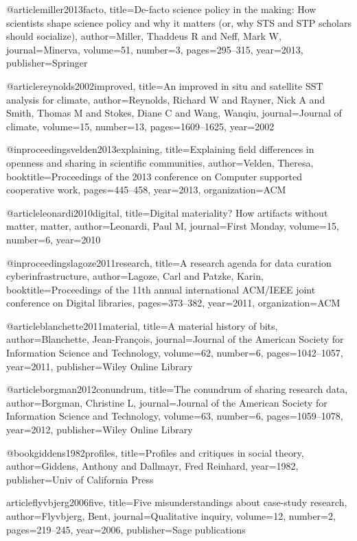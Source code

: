 @article{miller2013facto,
  title={De-facto science policy in the making: How scientists shape science policy and why it matters (or, why STS and STP scholars should socialize)},
  author={Miller, Thaddeus R and Neff, Mark W},
  journal={Minerva},
  volume={51},
  number={3},
  pages={295--315},
  year={2013},
  publisher={Springer}
}


@article{reynolds2002improved,
  title={An improved in situ and satellite SST analysis for climate},
  author={Reynolds, Richard W and Rayner, Nick A and Smith, Thomas M and Stokes, Diane C and Wang, Wanqiu},
  journal={Journal of climate},
  volume={15},
  number={13},
  pages={1609--1625},
  year={2002}
}


@inproceedings{velden2013explaining,
  title={Explaining field differences in openness and sharing in scientific communities},
  author={Velden, Theresa},
  booktitle={Proceedings of the 2013 conference on Computer supported cooperative work},
  pages={445--458},
  year={2013},
  organization={ACM}
}

@article{leonardi2010digital,
  title={Digital materiality? How artifacts without matter, matter},
  author={Leonardi, Paul M},
  journal={First Monday},
  volume={15},
  number={6},
  year={2010}
}


@inproceedings{lagoze2011research,
  title={A research agenda for data curation cyberinfrastructure},
  author={Lagoze, Carl and Patzke, Karin},
  booktitle={Proceedings of the 11th annual international ACM/IEEE joint conference on Digital libraries},
  pages={373--382},
  year={2011},
  organization={ACM}
}


@article{blanchette2011material,
  title={A material history of bits},
  author={Blanchette, Jean-Fran{\c{c}}ois},
  journal={Journal of the American Society for Information Science and Technology},
  volume={62},
  number={6},
  pages={1042--1057},
  year={2011},
  publisher={Wiley Online Library}
}

@article{borgman2012conundrum,
  title={The conundrum of sharing research data},
  author={Borgman, Christine L},
  journal={Journal of the American Society for Information Science and Technology},
  volume={63},
  number={6},
  pages={1059--1078},
  year={2012},
  publisher={Wiley Online Library}
}


@book{giddens1982profiles,
  title={Profiles and critiques in social theory},
  author={Giddens, Anthony and Dallmayr, Fred Reinhard},
  year={1982},
  publisher={Univ of California Press}
}

article{flyvbjerg2006five,
  title={Five misunderstandings about case-study research},
  author={Flyvbjerg, Bent},
  journal={Qualitative inquiry},
  volume={12},
  number={2},
  pages={219--245},
  year={2006},
  publisher={Sage publications}
}

